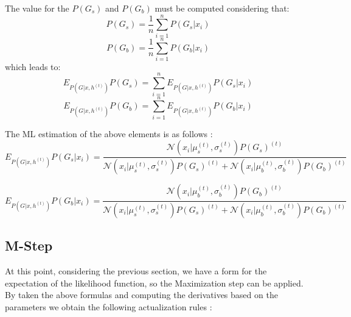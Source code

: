 The value for the $P(G_s)$ and $P(G_b)$ must be computed considering that:
$$P(G_s) = \frac{1}{n} \sum_{i = 1}^{n}P(G_s | x_i)$$
$$P(G_b) = \frac{1}{n} \sum_{i = 1}^{n}P(G_b | x_i)$$
which leads to:
$$E_{P(G | x, h^{(t)})} P(G_s) = \sum_{i=1}^{n} E_{P(G | x, h^{(t)})} P(G_s | x_i) $$
$$E_{P(G | x, h^{(t)})} P(G_b) = \sum_{i=1}^{n} E_{P(G | x, h^{(t)})} P(G_b | x_i) $$

The ML estimation of the above elements is as follows \cite{EMObjectConcealement}:
$$E_{P(G | x, h^{(t)})} P(G_s | x_i) = \frac{\mathcal{N}(x_i | \mu_s^{(t)}, \sigma_s^{(t)}) P(G_s)^{(t)}}{\mathcal{N}(x_i | \mu_s^{(t)}, \sigma_s^{(t)}) P(G_s)^{(t)} + \mathcal{N}(x_i | \mu_b^{(t)}, \sigma_b^{(t)}) P(G_b)^{(t)}}	$$

$$E_{P(G | x, h^{(t)})} P(G_b | x_i) = \frac{\mathcal{N}(x_i | \mu_b^{(t)}, \sigma_b^{(t)}) P(G_b)^{(t)}}{\mathcal{N}(x_i | \mu_s^{(t)}, \sigma_s^{(t)}) P(G_s)^{(t)} + \mathcal{N}(x_i | \mu_b^{(t)}, \sigma_b^{(t)}) P(G_b)^{(t)}}	$$

\subsection{M-Step}
At this point, considering the previous section, we have a form for the expectation of the likelihood function, so the Maximization step can be applied. By taken the above formulas and computing the derivatives based on the parameters we obtain the following actualization rules \cite{EMObjectConcealement}: \\


